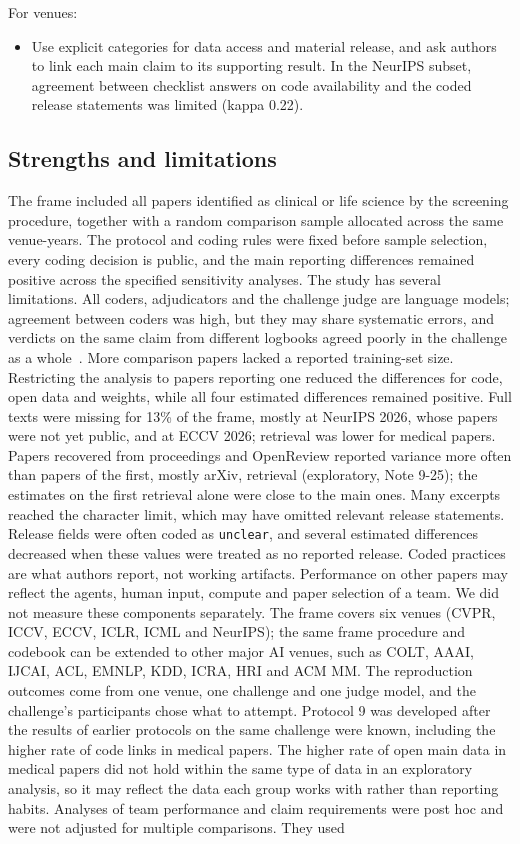 \documentclass[11pt]{article}
\begin{document}
For venues:

\begin{itemize}
\item Use explicit categories for data access and material release, and ask authors to link each main claim to its supporting result. In the NeurIPS subset, agreement between checklist answers on code availability and the coded release statements was limited (kappa 0.22).
\end{itemize}

\subsection*{Strengths and limitations}
The frame included all papers identified as clinical or life science by the screening procedure, together with a random comparison sample allocated across the same venue-years. The protocol and coding rules were fixed before sample selection, every coding decision is public, and the main reporting differences remained positive across the specified sensitivity analyses. The study has several limitations. All coders, adjudicators and the challenge judge are language models; agreement between coders was high, but they may share systematic errors, and verdicts on the same claim from different logbooks agreed poorly in the challenge as a whole~\cite{r13}. More comparison papers lacked a reported training-set size. Restricting the analysis to papers reporting one reduced the differences for code, open data and weights, while all four estimated differences remained positive. Full texts were missing for 13\% of the frame, mostly at NeurIPS 2026, whose papers were not yet public, and at ECCV 2026; retrieval was lower for medical papers. Papers recovered from proceedings and OpenReview reported variance more often than papers of the first, mostly arXiv, retrieval (exploratory, Note 9-25); the estimates on the first retrieval alone were close to the main ones. Many excerpts reached the character limit, which may have omitted relevant release statements. Release fields were often coded as \texttt{unclear}, and several estimated differences decreased when these values were treated as no reported release. Coded practices are what authors report, not working artifacts. Performance on other papers may reflect the agents, human input, compute and paper selection of a team. We did not measure these components separately. The frame covers six venues (CVPR, ICCV, ECCV, ICLR, ICML and NeurIPS); the same frame procedure and codebook can be extended to other major AI venues, such as COLT, AAAI, IJCAI, ACL, EMNLP, KDD, ICRA, HRI and ACM MM. The reproduction outcomes come from one venue, one challenge and one judge model, and the challenge's participants chose what to attempt. Protocol 9 was developed after the results of earlier protocols on the same challenge were known, including the higher rate of code links in medical papers. The higher rate of open main data in medical papers did not hold within the same type of data in an exploratory analysis, so it may reflect the data each group works with rather than reporting habits. Analyses of team performance and claim requirements were post hoc and were not adjusted for multiple comparisons. They used 
\end{document}
